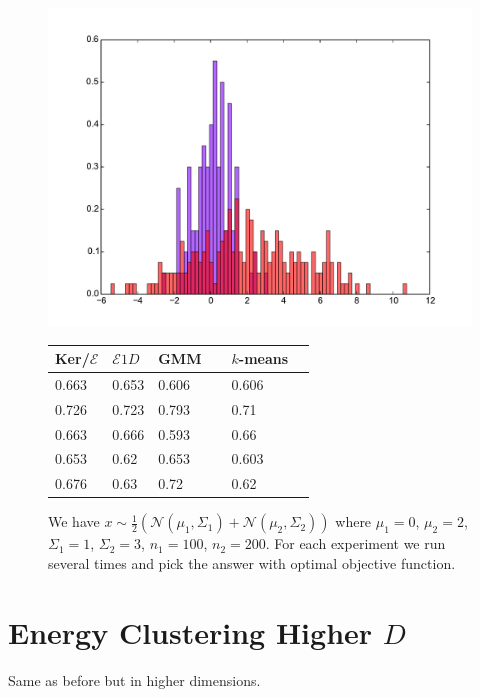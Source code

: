 \documentclass[aps,preprint,nofootinbib,floatfix]{revtex4-1}
\begin{document}
\begin{figure}[h]
\begin{minipage}{.49\textwidth}
\includegraphics[scale=.45]{hist1d_gauss2.pdf}
\end{minipage}
\begin{minipage}{.49\textwidth}
\begin{tabular}{ l l l l l}
\hline
Ker/$\mathcal{E}$ & $\mathcal{E} 1D$ & GMM~~ & $k$-means \\
\hline
0.663&
0.653&
0.606&
0.606\\
0.726&
0.723&
0.793&
0.71 \\
0.663&
0.666&
0.593&
0.66 \\
0.653&
0.62 &
0.653&
0.603\\
0.676&
0.63 &
0.72 & 
0.62 \\
\hline
\end{tabular}
\end{minipage}
\caption{\label{fig:1dloggaus1}
We have $x \sim \tfrac{1}{2}\left( \mathcal{N}(\mu_1, \Sigma_1) +
\mathcal{N}(\mu_2, \Sigma_2)\right)$ where $\mu_1 = 0$, $\mu_2=2$,
$\Sigma_1 = 1$, $ \Sigma_2 = 3$, $n_1 = 100$, $n_2=200$.
For each experiment we run several times and pick the answer with
optimal objective function.
}
\end{figure}


\clearpage

\section{Energy Clustering Higher $D$}

Same as before but in higher dimensions.
\end{document}
